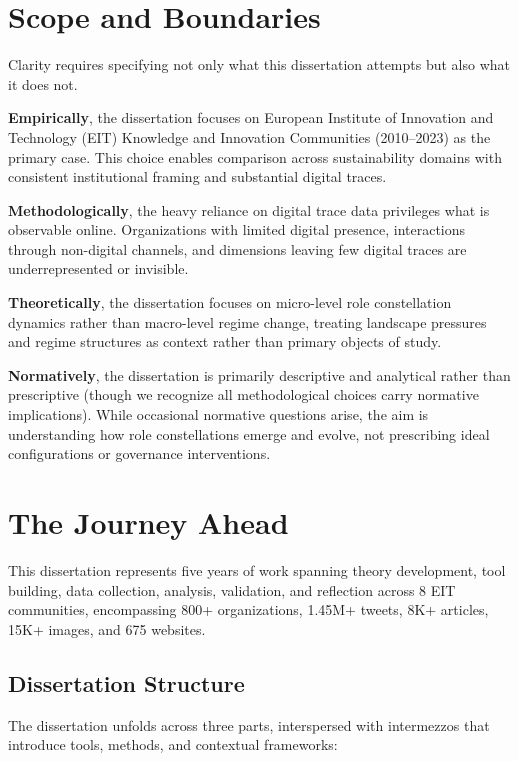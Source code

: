 \documentclass[../main.tex]{subfiles}
\begin{document}
\section{Scope and Boundaries}
\label{sec:intro:scope}

Clarity requires specifying not only what this dissertation attempts but also what it does not.

\textbf{Empirically}, the dissertation focuses on European Institute of Innovation and Technology (EIT) Knowledge and Innovation Communities (2010--2023) as the primary case. This choice enables comparison across sustainability domains with consistent institutional framing and substantial digital traces.

\textbf{Methodologically}, the heavy reliance on digital trace data privileges what is observable online. Organizations with limited digital presence, interactions through non-digital channels, and dimensions leaving few digital traces are underrepresented or invisible.

\textbf{Theoretically}, the dissertation focuses on micro-level role constellation dynamics rather than macro-level regime change, treating landscape pressures and regime structures as context rather than primary objects of study.

\textbf{Normatively}, the dissertation is primarily descriptive and analytical rather than prescriptive (though we recognize all methodological choices carry normative implications). While occasional normative questions arise, the aim is understanding how role constellations emerge and evolve, not prescribing ideal configurations or governance interventions.


\section{The Journey Ahead}
\label{sec:intro:journey}

This dissertation represents five years of work spanning theory development, tool building, data collection, analysis, validation, and reflection across 8 EIT communities, encompassing 800+ organizations, 1.45M+ tweets, 8K+ articles, 15K+ images, and 675 websites.

\subsection{Dissertation Structure}

The dissertation unfolds across three parts, interspersed with intermezzos that introduce tools, methods, and contextual frameworks:
\end{document}
